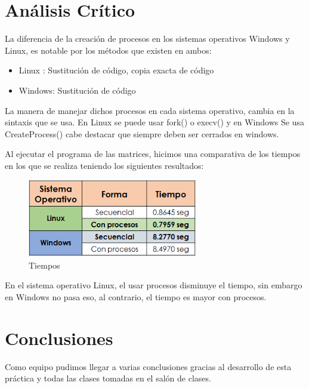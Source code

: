 \documentclass[12pt]{article}
\begin{document}
    \section{Análisis Crítico}
        La diferencia de la creación de procesos en los sistemas operativos Windows y Linux, es notable por los métodos que existen en ambos:
        \begin{itemize}
            \item Linux : Sustitución de código, copia exacta de código
            \item Windows: Sustitución de código
        \end{itemize}
       
       La manera de manejar dichos procesos en cada sistema operativo, cambia en la sintaxis que se usa. En Linux se puede usar fork() o execv() y en Windows Se usa CreateProcess() cabe destacar que siempre deben ser cerrados en windows.
       
       Al ejecutar el programa de las matrices, hicimos una comparativa de los tiempos en los que se realiza teniendo los siguientes resultados:
       \newpage
        \begin{figure}[h!]
            \centering
            \includegraphics[width=0.66\textwidth]{Practica4/Images/Comparacion.PNG}
            \caption{Tiempos}
        \end{figure}
        En el sistema operativo Linux, el usar procesos disminuye el tiempo, sin embargo en Windows no pasa eso, al contrario, el tiempo es mayor con procesos. 
        
        

    \section{Conclusiones}
        Como equipo pudimos llegar a varias conclusiones gracias al desarrollo de esta práctica y todas las clases tomadas en el salón de clases.
        
\end{document}
